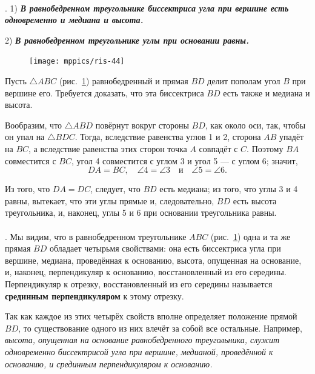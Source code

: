 \documentclass[oneside]{book}
\makeatletter
\newcommand{\rindex}[2][\imki@jobname]{%
  \index[#1]{\detokenize{#2}}%
}
\makeatother
\begin{document}
\paragraph{}\label{1938/38}
.
1) \textbf{\emph{В равнобедренном треугольнике биссектриса угла при вершине есть одновременно и медиана и высота.}}

2) \textbf{\emph{В равнобедренном треугольнике углы при основании равны.}}

\begin{figure}
\centering
\texttt{[image: mppics/ris-44]}
\caption{}\label{1938/ris-44}
\end{figure}


Пусть $\triangle ABC$ (рис.~\ref{1938/ris-44}) равнобедренный и прямая $BD$ делит пополам угол $B$ при вершине его.
Требуется доказать, что эта биссектриса $BD$ есть также и медиана и высота.

Вообразим, что $\triangle ABD$ повёрнут вокруг стороны $BD$, как около оси, так, чтобы он упал на $\triangle BDC$.
Тогда, вследствие равенства углов 1 и 2, сторона $AB$ упадёт на $BC$, а вследствие равенства этих сторон точка $A$ совпадёт с $C$.
Поэтому $BA$ совместится с $BC$, угол 4 совместится с углом 3 и угол 5 — с углом 6;
значит,
\[DA = BC,\quad \angle 4 = \angle 3\quad \text{и}\quad \angle 5 = \angle 6.\]

Из того, что $DA=DC$, следует, что $BD$ есть медиана;
из того, что углы 3 и 4 равны, вытекает, что эти углы прямые и, следовательно, $BD$ есть высота треугольника, и, наконец, углы 5 и 6 при основании треугольника равны.

\paragraph{}\label{1938/39}
.
Мы видим, что в равнобедренном треугольнике $ABC$ (рис.~\ref{1938/ris-44}) одна и та же прямая $BD$ обладает четырьмя свойствами:
она есть биссектриса угла при вершине, медиана, проведённая к основанию, высота, опущенная на основание, и, наконец, перпендикуляр к основанию, восстановленный из его середины. 
Перпендикуляр к отрезку, восстановленный из его середины называется \rindex{срединный перпендикуляр}\textbf{срединным перпендикуляром} к этому отрезку.

Так как каждое из этих четырёх свойств вполне определяет положение прямой $BD$, то существование одного из них влечёт за собой все остальные.
Например, \emph{высота, опущенная на основание равнобедренного треугольника, служит одновременно биссектрисой угла при вершине, медианой, проведённой к основанию, и срединным перпендикуляром к основанию.} 
\end{document}
